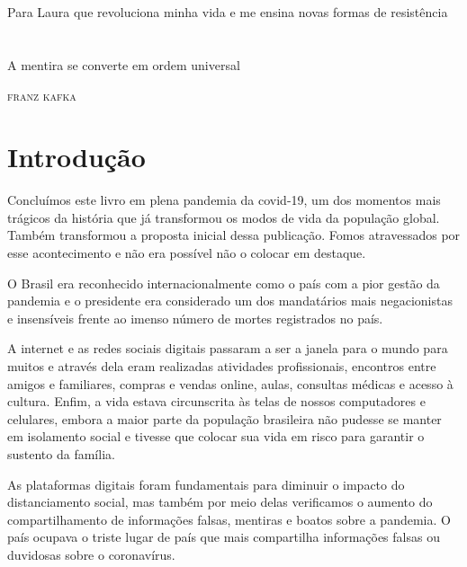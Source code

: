 \chapter*{}
\thispagestyle{empty}
\mbox{}\vspace*{\fill}
\epigraph{Para Laura que revoluciona minha vida e me ensina novas formas de resistência}{}
\mbox{}\vspace*{\fill}


\chapter*{}
\thispagestyle{empty}
\mbox{}\vspace*{\fill}
\epigraph{A mentira se converte em ordem universal}{\textsc{franz kafka}}
\mbox{}\vspace*{\fill}


\chapter{Introdução}

Concluímos este livro em plena pandemia da covid-19, um dos momentos
mais trágicos da história que já transformou os modos de vida da
população global. Também transformou a proposta inicial dessa
publicação. Fomos atravessados por esse acontecimento e não era possível
não o colocar em destaque.

O Brasil era reconhecido internacionalmente como o país com a pior
gestão da pandemia e o presidente era considerado um dos mandatários
mais negacionistas e insensíveis frente ao imenso número de mortes
registrados no país.

A internet e as redes sociais digitais passaram a ser a janela para o
mundo para muitos e através dela eram realizadas atividades
profissionais, encontros entre amigos e familiares, compras e vendas
online, aulas, consultas médicas e acesso à cultura. Enfim, a vida
estava circunscrita às telas de nossos computadores e celulares, embora
a maior parte da população brasileira não pudesse se manter em
isolamento social e tivesse que colocar sua vida em risco para garantir
o sustento da família.

As plataformas digitais foram fundamentais para diminuir o impacto do
distanciamento social, mas também por meio delas verificamos o aumento
do compartilhamento de informações falsas, mentiras e boatos sobre a
pandemia. O país ocupava o triste lugar de país que mais compartilha
informações falsas ou duvidosas sobre o coronavírus.


